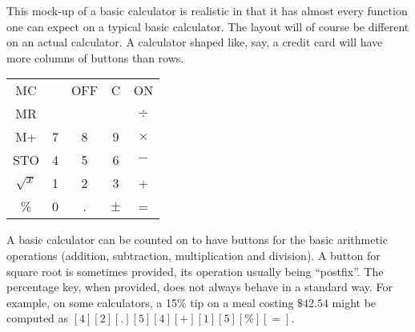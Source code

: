 \documentclass[12pt]{article}
\begin{document}
This mock-up of a basic calculator is realistic in that it has almost every function one can expect on a typical basic calculator. The layout will of course be different on an actual calculator. A calculator shaped like, say, a credit card will have more columns of buttons than rows.

\begin{tabular}{|c|c|c|c|c|}
MC & & OFF & C & ON \\
MR &  &  &  & $\div$ \\
M+ & 7 & 8 & 9 & $\times$ \\
STO & 4 & 5 & 6 & $-$ \\
$\sqrt{x}$ & 1 & 2 & 3 & + \\
\% & 0 & . & $\pm$ & = \\
\end{tabular}

A basic calculator can be counted on to have buttons for the basic arithmetic operations (addition, subtraction, multiplication and division). A button for square root is sometimes provided, its operation usually being ``postfix''. The percentage key, when provided, does not always behave in a standard way. For example, on some calculators, a 15\% tip on a meal costing $\$42.54$ might be computed as $[4] [2] [.] [5] [4] [+] [1] [5] [\%] [=]$.
\end{document}
